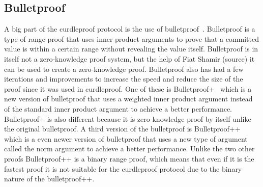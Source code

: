 \subsection{Bulletproof}\label{sec:related-work-bulletproofs}
A big part of the curdleproof protocol is the use of bulletproof~\cite{bunz2018bulletproofs}.
Bulletproof is a type of range proof that uses inner product arguments to prove that a committed value is within a certain range without revealing the value itself.
Bulletproof is in itself not a zero-knowledge proof system, but the help of Fiat Shamir (source) it can be used to create a zero-knowledge proof.
Bulletproof also has had a few iterations and improvements to increase the speed and reduce the size of the proof since it was used in curdleproof.
One of these is Bulletproof+~\cite{chung2022bulletproofs+} which is a new version of bulletproof that uses a weighted inner product argument instead of the standard inner product argument to achieve a better performance.
Bulletproof+ is also different because it is zero-knowledge proof by itself unlike the original bulletproof.
A third version of the bulletproof is Bulletproof++~\cite{eagen2024bulletproofs++} which is a even newer version of bulletproof that uses a new type of argument called the norm argument to achieve a better performance.
Unlike the two other proofs Bulletproof++ is a binary range proof, which means that even if it is the fastest proof it is not suitable for the curdleproof protocol due to the binary nature of the bulletproof++.